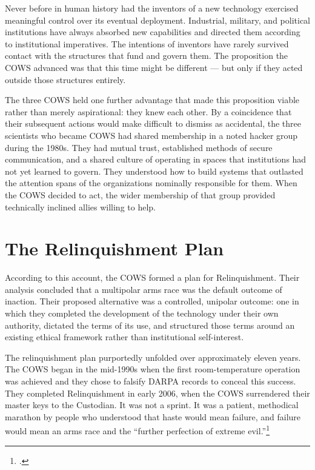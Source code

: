 Never before in human history had the inventors of a new technology exercised meaningful control over its eventual deployment. Industrial, military, and political institutions have always absorbed new capabilities and directed them according to institutional imperatives. The intentions of inventors have rarely survived contact with the structures that fund and govern them. The proposition the COWS advanced was that this time might be different --- but only if they acted outside those structures entirely.

The three COWS held one further advantage that made this proposition viable rather than merely aspirational: they knew each other. By a coincidence that their subsequent actions would make difficult to dismiss as accidental, the three scientists who became COWS had shared membership in a noted hacker group during the 1980s. They had mutual trust, established methods of secure communication, and a shared culture of operating in spaces that institutions had not yet learned to govern. They understood how to build systems that outlasted the attention spans of the organizations nominally responsible for them. When the COWS decided to act, the wider membership of that group provided technically inclined allies willing to help.

\section*{The Relinquishment Plan}
\label{pos18:the-relinquishment-plan}

According to this account, the COWS formed a plan for Relinquishment. Their analysis concluded that a multipolar arms race was the default outcome of inaction. Their proposed alternative was a controlled, unipolar outcome: one in which they completed the development of the technology under their own authority, dictated the terms of its use, and structured those terms around an existing ethical framework rather than institutional self-interest.

The relinquishment plan purportedly unfolded over approximately eleven years. The COWS began in the mid-1990s when the first room-temperature operation was achieved and they chose to falsify DARPA records to conceal this success. They completed Relinquishment in early 2006, when the COWS surrendered their master keys to the Custodian. It was not a sprint. It was a patient, methodical marathon by people who understood that haste would mean failure, and failure would mean an arms race and the ``further perfection of extreme evil.''\footcite{joy2000}

